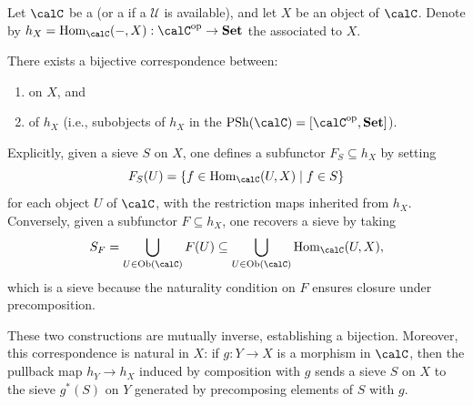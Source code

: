 \begin{proposition} \label{proposition:sieves_as_subfunctors_of_representable_functors}
Let $\calC$ be a  (or a  if a  $\mathscr{U}$ is available), and let $X$ be an object of $\calC$. Denote by $h_X = \operatorname{Hom}_{\calC}(-, X): \calC^{\operatorname{op}} \to \mathbf{Set}$ the  associated to $X$.

There exists a bijective correspondence between:
\begin{enumerate}
    \item {} on $X$, and
    \item {} of $h_X$ (i.e., subobjects of $h_X$ in the  $\operatorname{PSh}(\calC) = [\calC^{\operatorname{op}}, \mathbf{Set}]$).
\end{enumerate}

Explicitly, given a sieve $S$ on $X$, one defines a subfunctor $F_S \subseteq h_X$ by setting
$$F_S(U) = \{f \in \operatorname{Hom}_{\calC}(U, X) \mid f \in S\}$$
for each object $U$ of $\calC$, with the restriction maps inherited from $h_X$. Conversely, given a subfunctor $F \subseteq h_X$, one recovers a sieve by taking
$$S_F = \bigcup_{U \in \operatorname{Ob}(\calC)} F(U) \subseteq \bigcup_{U \in \operatorname{Ob}(\calC)} \operatorname{Hom}_{\calC}(U, X),$$
which is a sieve because the naturality condition on $F$ ensures closure under precomposition.

These two constructions are mutually inverse, establishing a bijection. Moreover, this correspondence is natural in $X$: if $g: Y \to X$ is a morphism in $\calC$, then the pullback map $h_Y \to h_X$ induced by composition with $g$ sends a sieve $S$ on $X$ to the sieve $g^*(S)$ on $Y$ generated by precomposing elements of $S$ with $g$.
\end{proposition}